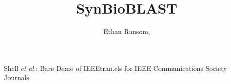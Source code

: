 \documentclass[journal,comsoc]{IEEEtran}
\begin{document}
%
\title{SynBioBLAST}
%
%
%

\author{Ethan Ransom, }

% 
%



%
{Shell \MakeLowercase{\textit{et al.}}: Bare Demo of IEEEtran.cls for IEEE Communications Society Journals}
% 
\end{document}
